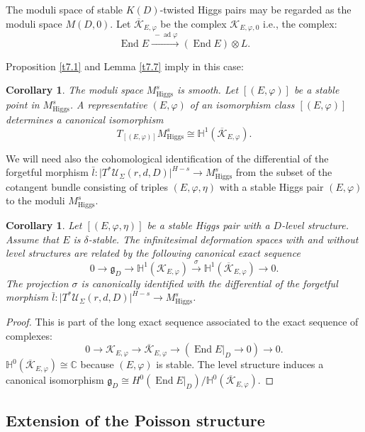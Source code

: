 \documentclass[12pt,a4paper,oneside,english]{smfart}
\newtheorem{cor}[thm]{Corollary}
\theoremstyle{definition}
\theoremstyle{remark}
\DeclareMathOperator{\End}{End}
\DeclareMathOperator{\ad}{ad}
\newcommand{\Hig}{\mathrm{Higgs}}
\newcommand{\MHs}{M^{s}_{\Hig}}
\newcommand{\cU}{\mathcal{U}}
\newcommand{\KK}{\mathscr{K}}
\newcommand{\HH}{\mathbb{H}}
\newcommand{\lbar}{\bar{l}}
\newcommand{\tot}[1]{\lvert #1 \rvert}
\begin{document}
The moduli space of stable $K(D)$-twisted Higgs pairs may be regarded as the moduli space $M(D, 0)$. Let $\overline{\KK}_{E, \varphi}$ be the complex $\KK_{E, \varphi, 0}$ i.e., the complex:
\[
\End E \xrightarrow{\ -\ad \varphi\ } (\End E) \otimes L.
\]

Proposition \ref{t7.1} and Lemma \ref{t7.7} imply in this case:

\begin{cor}\label{t7.9}
The moduli space $\MHs$ is smooth. Let $[(E, \varphi)]$ be a stable point in $\MHs$. A representative $(E, \varphi)$ of an isomorphism class $[(E, \varphi)]$ determines a canonical isomorphism
\[
T_{[(E, \varphi)]}\MHs \cong \HH^1(\overline{\KK}_{E, \varphi}).
\]
\end{cor}

We will need also the cohomological identification of the differential of the forgetful morphism $\lbar \colon \tot{T^*\cU_\Sigma(r, d, D)}^{H-s} \to \MHs$ from the subset of the cotangent bundle consisting of triples $(E, \varphi, \eta)$ with a stable Higgs pair $(E, \varphi)$ to the moduli $\MHs$.

\begin{cor}\label{t7.10}
Let $[(E, \varphi, \eta)]$ be a stable Higgs pair with a $D$-level structure. Assume that $E$ is $\delta$-stable. The infinitesimal deformation spaces with and without level structures are related by the following canonical exact sequence
\[
0 \to \mathfrak{g}_D \to \HH^1(\KK_{E, \varphi}) \xrightarrow{\ \sigma\ } \HH^1(\overline{\KK}_{E, \varphi}) \to 0.
\]
The projection $\sigma$ is canonically identified with the differential of the forgetful morphism $\lbar \colon \tot{T^*\cU_\Sigma(r, d, D)}^{H-s} \to \MHs$.
\end{cor}

\begin{proof}
This is part of the long exact sequence associated to the exact sequence of complexes:
\[
0 \to \KK_{E, \varphi} \to \overline{\KK}_{E, \varphi} \to (\End E|_D \to 0) \to 0.
\]
$\HH^0(\overline{\KK}_{E, \varphi}) \cong \mathbb{C}$ because $(E, \varphi)$ is stable. The level structure induces a canonical isomorphism $\mathfrak{g}_D \cong H^0(\End E|_D)/\HH^0(\overline{\KK}_{E, \varphi})$.
\end{proof}

\subsection{Extension of the Poisson structure}\label{sec:7.2}
\end{document}
